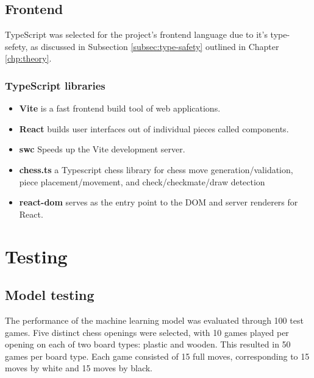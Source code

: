 \subsection*{Frontend}

TypeScript was selected for the project's frontend language due to it's type-sefety, as discussed in Subsection \ref{subsec:type-safety} outlined in Chapter \ref{chp:theory}.

\subsubsection*{TypeScript libraries}

\begin{itemize}
    \item \textbf{Vite} is a fast frontend build tool of web applications. \cite{ts:vite}
    
    \item \textbf{React} builds user interfaces out of individual pieces called components. \cite{ts:react}
    
    \item \textbf{\acrshort{swc}} Speeds up the Vite development server. \cite{ts:swc}
    
    \item \textbf{chess.ts} a Typescript chess library for chess move generation/validation, piece placement/movement, and check/checkmate/draw detection \cite{ts:chess}
    
    \item \textbf{react-dom} serves as the entry point to the DOM and server renderers for React. \cite{ts:react-dom}
\end{itemize}

\section{Testing}
\label{sec:testing}

\subsection{Model testing}
\label{subsec:model-testing}

The performance of the machine learning model was evaluated through 100 test games. Five distinct chess openings were selected, with 10 games played per opening on each of two board types: plastic and wooden. This resulted in 50 games per board type. Each game consisted of 15 full moves, corresponding to 15 moves by white and 15 moves by black. \\

